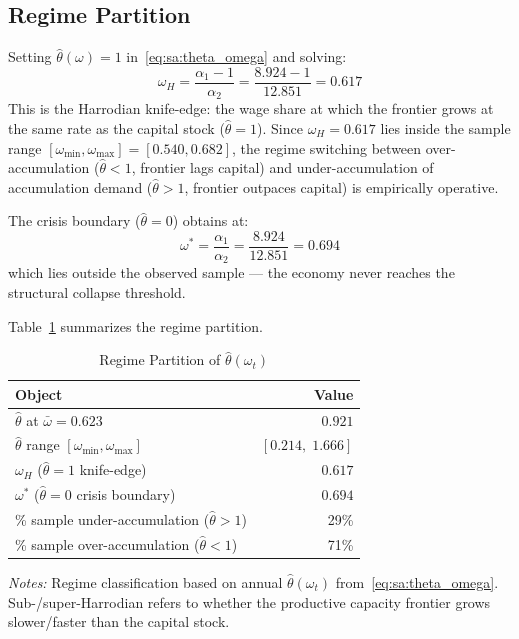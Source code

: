 \subsection{Regime Partition}
\label{app:sa:regime}

Setting $\hat{\theta}(\omega) = 1$ in~\eqref{eq:sa:theta_omega} and solving:
%
\begin{equation}
    \omega_H = \frac{\alpha_1 - 1}{\alpha_2} = \frac{8.924 - 1}{12.851}
    = 0.617
    \label{eq:sa:omega_H}
\end{equation}
%
This is the Harrodian knife-edge: the wage share at which the frontier
grows at the same rate as the capital stock ($\hat{\theta} = 1$). Since
$\omega_H = 0.617$ lies inside the sample range
$[\omega_{\min}, \omega_{\max}] = [0.540, 0.682]$, the regime switching
between over-accumulation ($\hat{\theta} < 1$, frontier lags capital) and
under-accumulation of accumulation demand ($\hat{\theta} > 1$, frontier outpaces capital) is empirically operative.

The crisis boundary ($\hat{\theta} = 0$) obtains at:
%
\begin{equation}
    \omega^* = \frac{\alpha_1}{\alpha_2} = \frac{8.924}{12.851}
    = 0.694
    \label{eq:sa:omega_star}
\end{equation}
%
which lies outside the observed sample --- the economy never reaches the
structural collapse threshold.

Table~\ref{tab:sa:regime_summary} summarizes the regime partition.

\begin{table}[htbp]
\centering
\caption{Regime Partition of $\hat{\theta}(\omega_t)$}
\label{tab:sa:regime_summary}
\begin{threeparttable}
\begin{tabular}{lr}
\toprule
Object & Value \\
\midrule
$\hat{\theta}$ at $\bar{\omega} = 0.623$ & $0.921$ \\
$\hat{\theta}$ range $[\omega_{\min}, \omega_{\max}]$ & $[0.214,\; 1.666]$ \\
$\omega_H$ ($\hat{\theta} = 1$ knife-edge) & $0.617$ \\
$\omega^*$ ($\hat{\theta} = 0$ crisis boundary) & $0.694$ \\
\% sample under-accumulation ($\hat{\theta} > 1$) & 29\% \\
\% sample over-accumulation ($\hat{\theta} < 1$) & 71\% \\
\bottomrule
\end{tabular}
\begin{tablenotes}
\small
\item \textit{Notes:} Regime classification based on annual
$\hat{\theta}(\omega_t)$ from~\eqref{eq:sa:theta_omega}.
Sub-/super-Harrodian refers to whether the productive capacity frontier
grows slower/faster than the capital stock.
\end{tablenotes}
\end{threeparttable}
\end{table}


